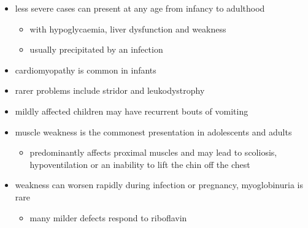 \documentclass{scrartcl}
\begin{document}
\begin{itemize}
\item less severe cases can present at any age from infancy to adulthood
\begin{itemize}
\item with hypoglycaemia, liver dysfunction and weakness
\item usually precipitated by an infection
\end{itemize}
\item cardiomyopathy is common in infants
\item rarer problems include stridor and leukodystrophy
\item mildly affected children may have recurrent bouts of vomiting
\item muscle weakness is the commonest presentation in adolescents and adults
\begin{itemize}
\item predominantly affects proximal muscles and may lead to scoliosis,
hypoventilation or an inability to lift the chin off the chest
\end{itemize}
\item weakness can worsen rapidly during infection or pregnancy, myoglobinuria is rare
\begin{itemize}
\item many milder defects respond to riboflavin
\end{itemize}
\end{itemize}
\end{document}
